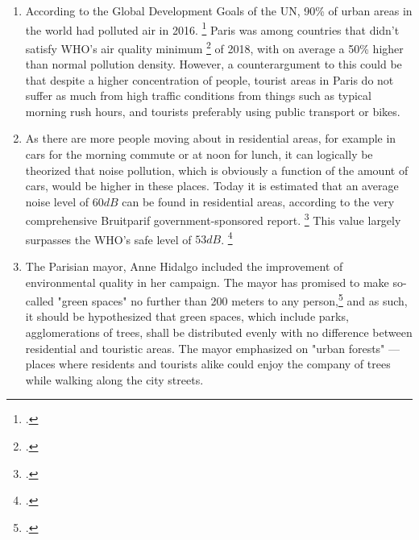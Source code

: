 \documentclass[11pt,letterpaper]{article}
\begin{document}
\begin{enumerate}
    \item According to the Global Development Goals of the UN, 90\% of urban areas in the world had polluted air in 2016. \footcite{sdg_report_2020} Paris was among countries that didn't satisfy WHO's air quality minimum \footcite{ambient_outdoor_air_pollution_2018} of 2018, with on average a 50\% higher than normal pollution density. However, a counterargument to this could be that despite a higher concentration of people, tourist areas in Paris do not suffer as much from high traffic conditions from things such as typical morning rush hours, and tourists preferably using public transport or bikes.

    \item As there are more people moving about in residential areas, for example in cars for the morning commute or at noon for lunch, it can logically be theorized that noise pollution, which is obviously a function of the amount of cars, would be higher in these places. Today it is estimated that an average noise level of $60dB$ can be found in residential areas, according to the very comprehensive Bruitparif government-sponsored report. \footcite{bruitparif} This value largely surpasses the WHO's safe level of $53dB$. \footcite{who_noise_guidelines}

    \item The Parisian mayor, Anne Hidalgo included the improvement of environmental quality in her campaign. The mayor has promised to make so-called "green spaces" no further than 200 meters to any person,\footcite{anne_hidalgo_2020} and as such, it should be hypothesized that green spaces, which include parks, agglomerations of trees, shall be distributed evenly with no difference between residential and touristic areas. The mayor emphasized on "urban forests" --- places where residents and tourists alike could enjoy the company of trees while walking along the city streets.
\end{enumerate}


\end{document}
